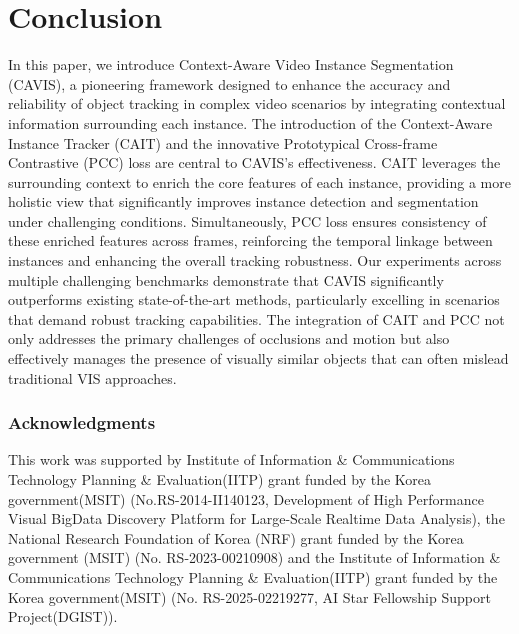 \documentclass[10pt,twocolumn,letterpaper]{article}
\begin{document}
\section{Conclusion}
In this paper, we introduce Context-Aware Video Instance Segmentation (CAVIS), a pioneering framework designed to enhance the accuracy and reliability of object tracking in complex video scenarios by integrating contextual information surrounding each instance. The introduction of the Context-Aware Instance Tracker (CAIT) and the innovative Prototypical Cross-frame Contrastive (PCC) loss are central to CAVIS's effectiveness. CAIT leverages the surrounding context to enrich the core features of each instance, providing a more holistic view that significantly improves instance detection and segmentation under challenging conditions. Simultaneously, PCC loss ensures consistency of these enriched features across frames, reinforcing the temporal linkage between instances and enhancing the overall tracking robustness.
Our experiments across multiple challenging benchmarks demonstrate that CAVIS significantly outperforms existing state-of-the-art methods, particularly excelling in scenarios that demand robust tracking capabilities. The integration of CAIT and PCC not only addresses the primary challenges of occlusions and motion but also effectively manages the presence of visually similar objects that can often mislead traditional VIS approaches. 












\subsubsection*{Acknowledgments}
This work was supported by Institute of Information \& Communications Technology Planning \& Evaluation(IITP) grant funded by the Korea government(MSIT) (No.RS-2014-II140123, Development of High Performance Visual BigData Discovery Platform for Large-Scale Realtime Data Analysis), the National Research Foundation of Korea (NRF) grant funded by the Korea government (MSIT) (No. RS-2023-00210908) and the Institute of Information \& Communications Technology Planning \& Evaluation(IITP) grant funded by the Korea government(MSIT) (No. RS-2025-02219277, AI Star Fellowship Support Project(DGIST)).


{
    \small
    
    
}
\end{document}
